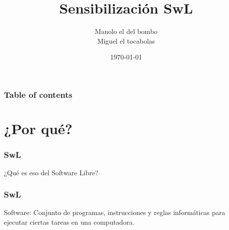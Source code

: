 \documentclass{beamer}
\title{Sensibilización SwL}
\author{Manolo el del bombo\\Miguel el tocabolas}
\date{\today}
\begin{document}
\begin{frame}
    \titlepage
\end{frame}

\begin{frame} \frametitle{Table of contents}
    \tableofcontents
\end{frame}


\section{¿Por qué?}

\begin{frame}\frametitle{SwL}
    ¿Qué es eso del Software Libre?
\end{frame}


\begin{frame}\frametitle{SwL}

    Software: \pause Conjunto de programas,
    instrucciones y reglas informáticas para
    ejecutar ciertas tareas en una computadora.

\end{frame}
\end{document}

